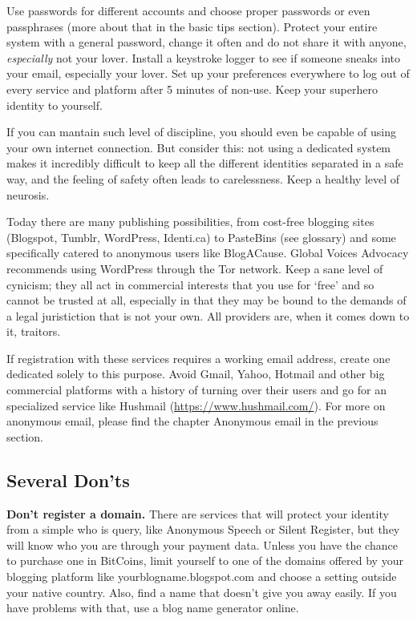 Use passwords for different accounts and choose proper passwords or even
passphrases (more about that in the basic tips section). Protect your
entire system with a general password, change it often and do not share
it with anyone, \emph{especially} not your lover. Install a keystroke
logger to see if someone sneaks into your email, especially your lover.
Set up your preferences everywhere to log out of every service and
platform after 5 minutes of non-use. Keep your superhero identity to
yourself.

If you can mantain such level of discipline, you should even be capable
of using your own internet connection. But consider this: not using a
dedicated system makes it incredibly difficult to keep all the different
identities separated in a safe way, and the feeling of safety often
leads to carelessness. Keep a healthy level of neurosis.

Today there are many publishing possibilities, from cost-free blogging
sites (Blogspot, Tumblr, WordPress, Identi.ca) to PasteBins (see
glossary) and some specifically catered to anonymous users like
BlogACause. Global Voices Advocacy recommends using WordPress through
the Tor network. Keep a sane level of cynicism; they all act in
commercial interests that you use for `free' and so cannot be trusted at
all, especially in that they may be bound to the demands of a legal
juristiction that is not your own. All providers are, when it comes down
to it, traitors.

If registration with these services requires a working email address,
create one dedicated solely to this purpose. Avoid Gmail, Yahoo, Hotmail
and other big commercial platforms with a history of turning over their
users and go for an specialized service like Hushmail
(\href{https://www.hushmail.com/}{https://www.hushmail.com/}). For more
on anonymous email, please find the chapter Anonymous email in the
previous section.

\subsection{Several Don'ts}

\textbf{Don't register a domain.} There are services that will protect
your identity from a simple who is query, like Anonymous Speech or
Silent Register, but they will know who you are through your payment
data. Unless you have the chance to purchase one in BitCoins, limit
yourself to one of the domains offered by your blogging platform like
yourblogname.blogspot.com and choose a setting outside your native
country. Also, find a name that doesn't give you away easily. If you
have problems with that, use a blog name generator online.

